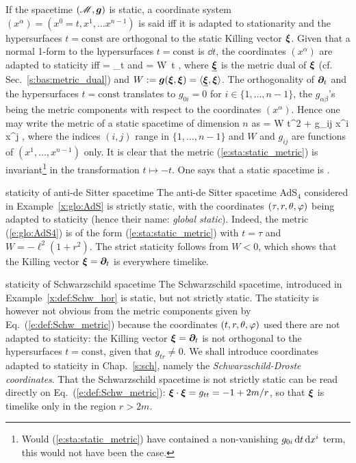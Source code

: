 If the spacetime $(\mathscr{M},\bm{g})$ is static, a coordinate system $(x^\alpha) = (x^0=t, x^1, \ldots  x^{n-1})$
is said  iff it is adapted to stationarity and the hypersurfaces
$t=\mathrm{const}$ are orthogonal to the static Killing vector $\bm{\xi}$.
Given that a normal 1-form to the hypersurfaces $t=\mathrm{const}$ is $\dd t$,
the coordinates $(x^\alpha)$ are adapted to staticity iff
\be \label{e:sta:xi_wpar_t}
    \w{\xi} = \wpar_t \qquad\mbox{and}\qquad \uu{\xi} = W\, \dd t ,
\ee
where $\underline{\bm{\xi}}$ is the metric dual of $\bm{\xi}$ (cf. Sec.~\ref{s:bas:metric_dual})
and $W := \bm{g}(\bm{\xi},\bm{\xi}) = \langle  \underline{\bm{\xi}}, \bm{\xi} \rangle$.
The orthogonality of $\bm{\partial}_t$ and the hypersurfaces $t=\mathrm{const}$
translates to $g_{0i}=0$ for $i\in\{1,\ldots,n-1\}$,
the $g_{\alpha\beta}$'s being the metric components with respect to the coordinates
$(x^\alpha)$. Hence one may write the metric of a static spacetime of dimension $n$ as
\be \label{e:sta:static_metric}
     = W \dd t^2 + g_{ij} \dd x^i \dd x^j ,
\ee
where the indices $(i,j)$ range in $\{1,\ldots,n-1\}$
and $W$ and $g_{ij}$ are functions of $(x^1,\ldots,x^{n-1})$ only.
It is clear that the metric (\ref{e:sta:static_metric}) is invariant\footnote{Would
(\ref{e:sta:static_metric}) have contained a non-vanishing $g_{0i}\, \mathrm{d} t \, \mathrm{d} x^i$ term,
this would not have been the case.} in the
transformation $t\mapsto-t$. One says that a static spacetime is
.

\begin{texample}{staticity of anti-de Sitter spacetime}{}
The anti-de Sitter spacetime AdS$_{4}$ considered in Example~\ref{x:glo:AdS}
is strictly static, with the coordinates $(\tau, r, \theta,\varphi)$ being
adapted to staticity (hence their name: \emph{global static}).
Indeed, the metric (\ref{e:glo:AdS4}) is of the form (\ref{e:sta:static_metric})
with $t = \tau$ and $W = -\ell^2(1+ r^2)$. The strict staticity follows from $W < 0$, which
shows that the Killing vector $\bm{\xi} = \bm{\partial}_t$ is everywhere timelike.
\end{texample}

\begin{texample}{staticity of Schwarzschild spacetime}{}
The Schwarzschild spacetime, introduced in Example~\ref{x:def:Schw_hor} is static, but not
strictly static. The staticity is however not obvious from the metric components
given by Eq.~(\ref{e:def:Schw_metric}) because the coordinates
$(t,r,\theta,\varphi)$ used there are not adapted to staticity: the Killing vector
$\bm{\xi} = \bm{\partial}_t$ is not orthogonal to the hypersurfaces $t=\mathrm{const}$,
given that $g_{tr} \neq 0$. We shall introduce coordinates adapted to
staticity in Chap.~\ref{s:sch}, namely the \emph{Schwarzschild-Droste coordinates}.
That the Schwarzschild spacetime is not strictly static can be read directly on
Eq.~(\ref{e:def:Schw_metric}): $\bm{\xi}\cdot\bm{\xi} = g_{tt} = -1 + 2m/r$, so
that $\bm{\xi}$ is timelike only in the region $r > 2 m$.
\end{texample}


